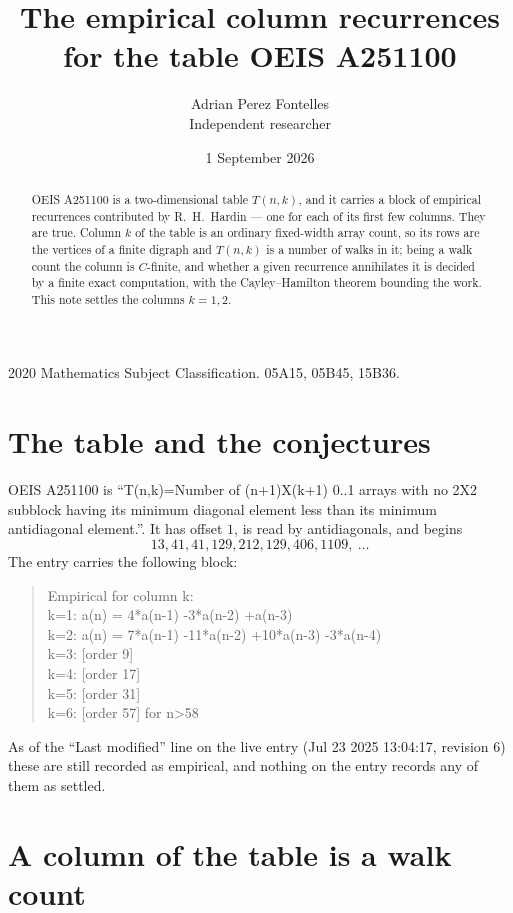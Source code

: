 \documentclass[11pt,a4paper]{article}
\title{The empirical column recurrences for the table OEIS A251100}
\author{Adrian Perez Fontelles\\ \small Independent researcher}
\date{1 September 2026}
\theoremstyle{plain}
\theoremstyle{definition}
\begin{document}
\maketitle

\begin{abstract}
OEIS A251100 is a two-dimensional table $T(n,k)$, and it carries a block of empirical
recurrences contributed by R.~H.~Hardin --- one for each of its first few columns. They are
true. Column $k$ of the table is an ordinary fixed-width array count, so its rows are the
vertices of a finite digraph and $T(n,k)$ is a number of walks in it; being a walk count the
column is $C$-finite, and whether a given recurrence annihilates it is decided by a finite
exact computation, with the Cayley--Hamilton theorem bounding the work. This note settles the columns $k=1, 2$.
\end{abstract}

\noindent\small 2020 Mathematics Subject Classification. 05A15, 05B45, 15B36.\normalsize

\section{The table and the conjectures}

OEIS A251100 is ``T(n,k)=Number of (n+1)X(k+1) 0..1 arrays with no 2X2 subblock having its minimum diagonal element less than its minimum antidiagonal element.''. It has offset $1$, is
read by antidiagonals, and begins
\[
13, 41, 41, 129, 212, 129, 406, 1109,\ \dots
\]
The entry carries the following block:
\begin{quote}\small
Empirical for column k:\\
k=1: a(n) = 4*a(n-1) -3*a(n-2) +a(n-3)\\
k=2: a(n) = 7*a(n-1) -11*a(n-2) +10*a(n-3) -3*a(n-4)\\
k=3: [order 9]\\
k=4: [order 17]\\
k=5: [order 31]\\
k=6: [order 57] for n>58\\
\end{quote}
As of the ``Last modified'' line on the live entry (Jul 23 2025 13:04:17, revision 6) these are still
recorded as empirical, and nothing on the entry records any of them as settled.

\section{A column of the table is a walk count}
\end{document}
